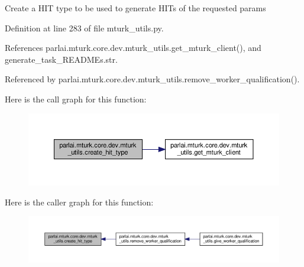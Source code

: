 \begin{DoxyVerb}Create a HIT type to be used to generate HITs of the requested params\end{DoxyVerb}
 

Definition at line 283 of file mturk\+\_\+utils.\+py.



References parlai.\+mturk.\+core.\+dev.\+mturk\+\_\+utils.\+get\+\_\+mturk\+\_\+client(), and generate\+\_\+task\+\_\+\+R\+E\+A\+D\+M\+Es.\+str.



Referenced by parlai.\+mturk.\+core.\+dev.\+mturk\+\_\+utils.\+remove\+\_\+worker\+\_\+qualification().

Here is the call graph for this function\+:
\nopagebreak
\begin{figure}[H]
\begin{center}
\leavevmode
\includegraphics[width=350pt]{namespaceparlai_1_1mturk_1_1core_1_1dev_1_1mturk__utils_acd08d4459a8231afa32daccd82c5c957_cgraph}
\end{center}
\end{figure}
Here is the caller graph for this function\+:
\nopagebreak
\begin{figure}[H]
\begin{center}
\leavevmode
\includegraphics[width=350pt]{namespaceparlai_1_1mturk_1_1core_1_1dev_1_1mturk__utils_acd08d4459a8231afa32daccd82c5c957_icgraph}
\end{center}
\end{figure}
\mbox{\label{namespaceparlai_1_1mturk_1_1core_1_1dev_1_1mturk__utils_a471ced1f7df897dcf3414dd49b84ddeb}} 
